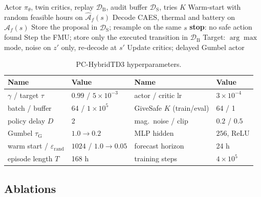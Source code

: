 \documentclass[conference]{IEEEtran}
\newcommand{\Afhat}{\widehat{\mathcal{A}}_{f}}
\begin{document}
\begin{algorithm}[!t]
\caption{PC-HybridTD3}
\label{alg:pc-hybridtd3}
\begin{algorithmic}[1]
\Require Actor \(\pi_{\theta}\), twin critics, replay \(\mathcal{D}_{\mathrm{B}}\), audit buffer \(\mathcal{D}_{\mathrm{S}}\), tries \(K\)
\State Warm-start with random feasible hours on \(\Afhat(s)\)
    \Repeat
      \State Decode CAES, thermal and battery on \(\Afhat(s)\)
        \State Store the proposal in \(\mathcal{D}_{\mathrm{S}}\); resample on the same \(s\)
      \EndIf
      \State \textbf{stop}: no safe action found
    \EndIf
    \State Step the FMU; store only the executed transition in \(\mathcal{D}_{\mathrm{B}}\)
    \State Target: \(\arg\max\) mode, noise on \(z'\) only, re-decode at \(s'\)
    \State Update critics; delayed Gumbel actor
  \EndFor
\EndFor
\end{algorithmic}
\end{algorithm}

\begin{table}[!t]
\caption{PC-HybridTD3 hyperparameters.}
\label{tab:hyper}
\centering
\scriptsize
\begin{tabular}{@{}llll@{}}
\toprule
Name & Value & Name & Value \\
\midrule
\(\gamma\) / target \(\tau\) & \(0.99\) / \(5\times10^{-3}\) & actor / critic lr & \(3\times10^{-4}\) \\
batch / buffer & 64 / \(1\times10^{5}\) & GiveSafe \(K\) (train/eval) & 64 / 1 \\
policy delay \(D\) & 2 & mag.\ noise / clip & \(0.2\) / \(0.5\) \\
Gumbel \(\tau_{\mathrm{G}}\) & \(1.0\to 0.2\) & MLP hidden & \(256\), ReLU \\
warm start / \(\varepsilon_{\mathrm{rand}}\) & \(1024\) / \(1.0\to 0.05\) & forecast horizon & 24 h \\
episode length \(T\) & 168 h & training steps & \(4\times10^{5}\) \\
\bottomrule
\end{tabular}
\end{table}

\subsection{Ablations}
\label{sec:ablation}
\end{document}

